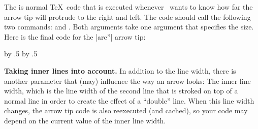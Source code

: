 \begin{command}{\pgfarrowsdeclare{}}


  The  is normal \TeX\ code that is executed
  whenever \pgfname\ wants to know how far the arrow tip will protrude
  to the right and left. The code should call the following two
  commands: \declare{|\pgfarrowsrightextend|} and
  \declare{|\pgfarrowsleftextend|}. Both arguments take one argument
  that specifies the size. Here is the final code for the |arc''| arrow
  tip:
\begin{codeexample}[]
{
  \arrowsize=0.2pt
  \advance\arrowsize by .5\pgflinewidth
  \pgfarrowsleftextend{-4\arrowsize-.5\pgflinewidth}
  \pgfarrowsrightextend{.5\pgflinewidth}
}
{
  \arrowsize=0.2pt
  \advance\arrowsize by .5\pgflinewidth
  \pgfsetdash{}{0pt} %
  \pgfsetroundjoin   %
  \pgfsetroundcap    %
  \pgfpathmoveto{\pgfpoint{-4\arrowsize}{4\arrowsize}}
  \pgfusepathqstroke
  \pgfpathmoveto{\pgfpointorigin}
  \pgfusepathqstroke
}
\end{codeexample}

  \medskip
  \textbf{Taking inner lines into account.}
  In addition to the line width, there is another parameter that (may)
  influence the way an arrow looks: The inner line width, which is the
  line width of the second line that is stroked on top of a normal
  line in order to create the effect of a ``double'' line. When this
  line width changes, the arrow tip code is also reexecuted (and
  cached), so your code may depend on the current value of the inner
  line width.


\end{command}
